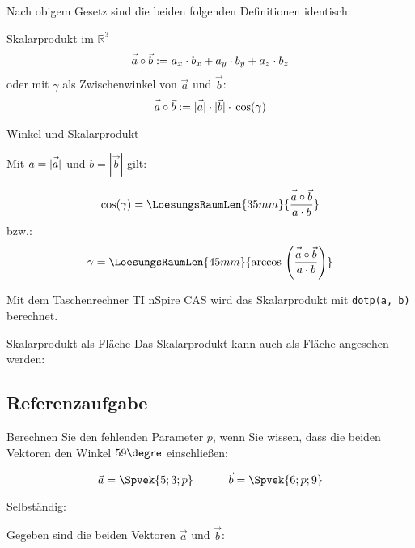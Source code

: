 Nach obigem Gesetz sind die beiden folgenden Definitionen identisch:
\begin{definition}{Skalarprodukt im $\mathbb{R}^3$}{}
  $$\vec{a\vphantom{b}}\circ\vec{b} := a_x\cdot{}b_x + a_y \cdot{} b_y + a_z\cdot{}b_z$$
oder mit $\gamma$ als Zwischenwinkel von $\vec{a}$ und $\vec{b}$:
  $$\vec{a\vphantom{b}}\circ\vec{b} := |\vec{\vphantom{b}a}| \cdot{} |\vec{b}| \cdot{}\cos({\gamma})$$
\end{definition}


\begin{gesetz}{Winkel und
    Skalarprodukt}{}


  Mit $a=|\vec{\vphantom{b}a}|$ und $b = |\vec{b}|$ gilt:
  
  $$\cos(\gamma) = \LoesungsRaumLen{35mm}{\frac{\vec{a\vphantom{b}}\circ\vec{b}}{a\cdot b}}$$
  bzw.:
  $$\gamma = \LoesungsRaumLen{45mm}{\arccos{} \left(\frac{\vec{a\vphantom{b}}\circ\vec{b}}{a\cdot b}\right)}$$
  
\end{gesetz}

Mit dem Taschenrechner TI nSpire CAS wird das Skalarprodukt mit
\texttt{dotp(a, b)} berechnet.

\begin{bemerkung}{Skalarprodukt als Fläche}{}
  Das Skalarprodukt kann auch als Fläche angesehen werden:
  
\end{bemerkung}
\newpage
\subsection{Referenzaufgabe}
Berechnen Sie den fehlenden Parameter $p$, wenn Sie wissen, dass die
beiden Vektoren den Winkel $59\degre$ einschließen:

$$\vec{a} = \Spvek{5;3;p} \hspace{11mm} \vec{b} = \Spvek{6;p;9}$$


  Selbständig:

Gegeben sind die beiden Vektoren $\vec{a}$ und $\vec{b}$:

